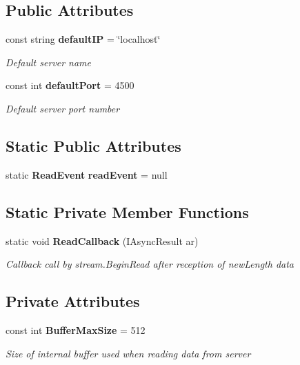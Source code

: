 \subsection*{Public Attributes}
\begin{DoxyCompactItemize}
\item 
const string \textbf{ default\+IP} = \char`\"{}localhost\char`\"{}
\begin{DoxyCompactList}\small\item\em Default server name \end{DoxyCompactList}\item 
const int \textbf{ default\+Port} = 4500
\begin{DoxyCompactList}\small\item\em Default server port number \end{DoxyCompactList}\end{DoxyCompactItemize}
\subsection*{Static Public Attributes}
\begin{DoxyCompactItemize}
\item 
static \textbf{ Read\+Event} \textbf{ read\+Event} = null
\end{DoxyCompactItemize}
\subsection*{Static Private Member Functions}
\begin{DoxyCompactItemize}
\item 
static void \textbf{ Read\+Callback} (I\+Async\+Result ar)
\begin{DoxyCompactList}\small\item\em Callback call by stream.\+Begin\+Read after reception of new\+Length data \end{DoxyCompactList}\end{DoxyCompactItemize}
\subsection*{Private Attributes}
\begin{DoxyCompactItemize}
\item 
const int \textbf{ Buffer\+Max\+Size} = 512
\begin{DoxyCompactList}\small\item\em Size of internal buffer used when reading data from server \end{DoxyCompactList}\end{DoxyCompactItemize}
